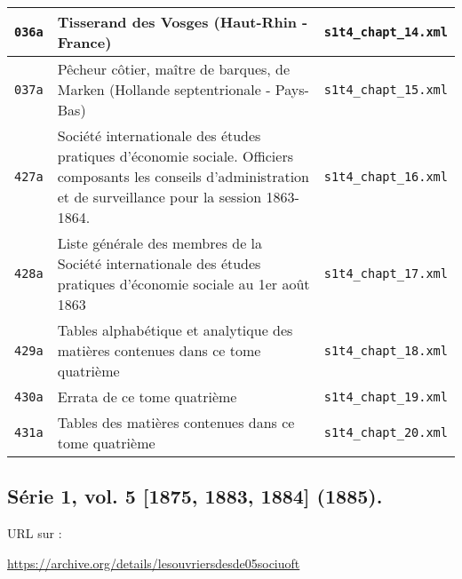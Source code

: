 \begin{center}
\begin{longtable}{ | c | p{9.5cm} | c | }
\texttt{036a} & Tisserand des Vosges (Haut-Rhin - France) & \texttt{s1t4\_chapt\_14.xml} \\ \hline
\texttt{037a} & Pêcheur côtier, maître de barques, de Marken (Hollande septentrionale - Pays-Bas) & \texttt{s1t4\_chapt\_15.xml} \\ \hline
\texttt{427a} & Société internationale des études pratiques d'économie sociale. Officiers composants les conseils d'administration et de surveillance pour la session 1863-1864. & \texttt{s1t4\_chapt\_16.xml} \\ \hline
\texttt{428a} & Liste générale des membres de la Société internationale des études pratiques d'économie sociale au 1er août 1863 & \texttt{s1t4\_chapt\_17.xml} \\ \hline
\texttt{429a} & Tables alphabétique et analytique des matières contenues dans ce tome quatrième & \texttt{s1t4\_chapt\_18.xml} \\ \hline
\texttt{430a} & Errata de ce tome quatrième & \texttt{s1t4\_chapt\_19.xml} \\ \hline
\texttt{431a} & Tables des matières contenues dans ce tome quatrième & \texttt{s1t4\_chapt\_20.xml} \\ \hline
\end{longtable}
\end{center}

\subsection{Série 1, vol. 5 [1875, 1883, 1884] (1885).}
\label{mappings1t5}

URL sur \ia{} : 

\url{https://archive.org/details/lesouvriersdesde05sociuoft}


